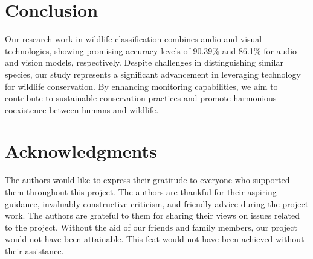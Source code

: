 \documentclass[fleqn, 10pt, twoside]{IOEGC}
\begin{document}
\section{Conclusion}
Our research work in wildlife classification combines audio and visual technologies, showing promising accuracy levels of 90.39\% and 86.1\% for audio and vision models, respectively. Despite challenges in distinguishing similar species, our study represents a significant advancement in leveraging technology for wildlife conservation. By enhancing monitoring capabilities, we aim to contribute to sustainable conservation practices and promote harmonious coexistence between humans and wildlife.



\section*{Acknowledgments}
The authors would like to express their gratitude to everyone who supported
them throughout this project. The authors are thankful for their aspiring guidance,
invaluably constructive criticism, and friendly advice during the project work. The authors are
grateful to them for sharing their views on issues related to the project. Without the aid
of our friends and family members, our project would not have been attainable. This
feat would not have been achieved without their assistance.













\vfill\null
\end{document}
